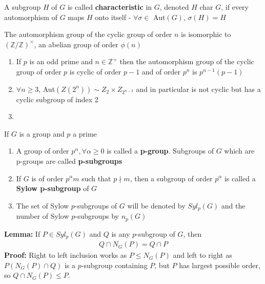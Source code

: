 \documentclass[titlepage, 12pt]{book}
\begin{document}
\begin{definition}{}{}
    A subgroup $H$ of $G$ is called \textbf{characteristic} in $G$, denoted $H$
    char $G$, if every automorphism of $G$ maps $H$ onto itself -
    $\forall\sigma\in$ Aut$(G)$, $\sigma(H) = H$
\end{definition}

\begin{proposition}{}{}
    The automorphism group of the cyclic group of order $n$ is isomorphic to
    $(\mathbb{Z}/\mathbb{Z})^\times$, an abelian group of order $\phi(n)$
\end{proposition}

\begin{proposition}{}{}
    \begin{enumerate}
        \item If $p$ is an odd prime and $n\in\mathbb{Z}^+$ then the
            automorphism group of the cyclic group of order $p$ is cyclic of
            order $p-1$ and of order $p^n$ is $p^{n-1}(p-1)$
        \item $\forall n\geq 3$, Aut$(Z(2^n))\sim Z_2\times Z_{2^{n-2}}$ and in
            particular is not cyclic but has a cyclic subgroup of index 2
        \item 
    \end{enumerate}
\end{proposition}

\begin{definition}{}{}
    If $G$ is a group and $p$ a prime
    \begin{enumerate}
        \item A group of order $p^\alpha,\forall\alpha\geq 0$ is called a
            \textbf{p-group}. Subgroups of $G$ which are p-groups are called
            \textbf{p-subgroups}
        \item If $G$ is of order $p^\alpha m$ such that $p\nmid m$, then a
            subgroup of order $p^\alpha$ is called a \textbf{Sylow p-subgroup}
            of $G$
        \item The set of Sylow $p$-subgroups of $G$ will be denoted by
            $Syl_p(G)$ and the number of Sylow $p$-subgroups by $n_p(G)$
    \end{enumerate}
\end{definition}

\textbf{Lemma:} If $P\in Syl_p(G)$ and $Q$ is any $p$-subgroup of $G$, then
\begin{gather*}
Q\cap N_G(P) = Q\cap P
\end{gather*}
\textbf{Proof:} Right to left inclusion works as $P\leq N_G(P)$ and left to
right as $P(N_G(P)\cap Q)$ is a $p$-subgroup containing $P$, but $P$ has largest
possible order, so $Q\cap N_G(P)\leq P$.
\end{document}

